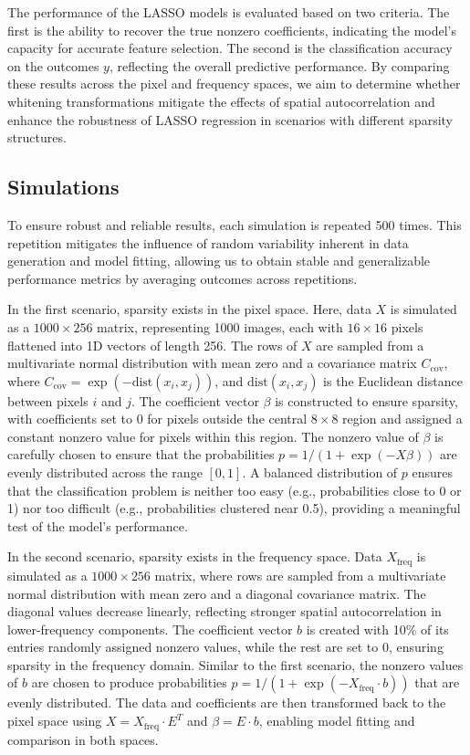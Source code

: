 \documentclass[12pt]{article}
\begin{document}
The performance of the LASSO models is evaluated based on two criteria. The first is the ability to recover the true nonzero coefficients, indicating the model's capacity for accurate feature selection. The second is the classification accuracy on the outcomes \( y \), reflecting the overall predictive performance. By comparing these results across the pixel and frequency spaces, we aim to determine whether whitening transformations mitigate the effects of spatial autocorrelation and enhance the robustness of LASSO regression in scenarios with different sparsity structures.



\subsection{Simulations}

To ensure robust and reliable results, each simulation is repeated 500 times. This repetition mitigates the influence of random variability inherent in data generation and model fitting, allowing us to obtain stable and generalizable performance metrics by averaging outcomes across repetitions.

In the first scenario, sparsity exists in the pixel space. Here, data \( X \) is simulated as a \( 1000 \times 256 \) matrix, representing 1000 images, each with \( 16 \times 16 \) pixels flattened into 1D vectors of length 256. The rows of \( X \) are sampled from a multivariate normal distribution with mean zero and a covariance matrix \( C_{\text{cov}} \), where \( C_{\text{cov}} = \exp(-\text{dist}(x_i, x_j)) \), and \( \text{dist}(x_i, x_j) \) is the Euclidean distance between pixels \( i \) and \( j \). The coefficient vector \( \beta \) is constructed to ensure sparsity, with coefficients set to 0 for pixels outside the central \( 8 \times 8 \) region and assigned a constant nonzero value for pixels within this region. The nonzero value of \( \beta \) is carefully chosen to ensure that the probabilities \( p = 1 / (1 + \exp(-X \beta)) \) are evenly distributed across the range \( [0, 1] \). A balanced distribution of \( p \) ensures that the classification problem is neither too easy (e.g., probabilities close to 0 or 1) nor too difficult (e.g., probabilities clustered near 0.5), providing a meaningful test of the model's performance.

In the second scenario, sparsity exists in the frequency space. Data \( X_{\text{freq}} \) is simulated as a \( 1000 \times 256 \) matrix, where rows are sampled from a multivariate normal distribution with mean zero and a diagonal covariance matrix. The diagonal values decrease linearly, reflecting stronger spatial autocorrelation in lower-frequency components. The coefficient vector \( b \) is created with 10\% of its entries randomly assigned nonzero values, while the rest are set to 0, ensuring sparsity in the frequency domain. Similar to the first scenario, the nonzero values of \( b \) are chosen to produce probabilities \( p = 1 / (1 + \exp(-X_{\text{freq}} \cdot b)) \) that are evenly distributed. The data and coefficients are then transformed back to the pixel space using \( X = X_{\text{freq}} \cdot E^T \) and \( \beta = E \cdot b \), enabling model fitting and comparison in both spaces.
\end{document}
